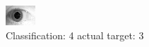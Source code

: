 \begin{figure}[h!]
\begin{center}
\includegraphics[width=0.60\columnwidth]{figures/ID1895_class_4_target_3.png}
\end{center}
\caption{ Classification: 4 actual target: 3}
\label{fig:ID1895_class_4_target_3}
\end{figure}
